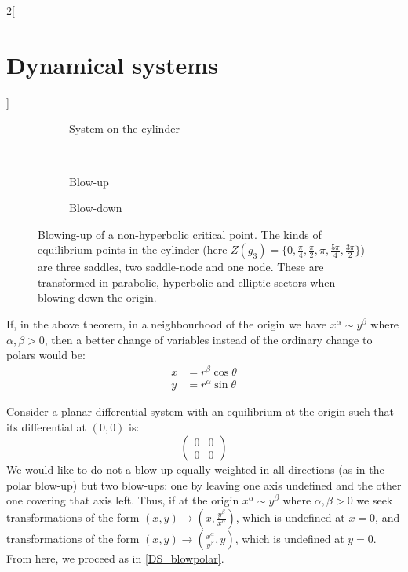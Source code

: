 \documentclass[../../../main_math.tex]{subfiles}
\begin{document}
\begin{multicols}{2}[\section{Dynamical systems}]
\begin{theorem}
  \end{theorem}
  \begin{figure}[H]
    \centering
    \begin{subfigure}[b]{\linewidth}
      \centering
      
      \caption{System on the cylinder}
    \end{subfigure}
    \\
    \begin{subfigure}[b]{0.48\linewidth}
      \centering
      
      \caption{Blow-up}
    \end{subfigure}
    \hfill
    \begin{subfigure}[b]{0.48\linewidth}
      \centering
      
      \caption{Blow-down}
    \end{subfigure}
    \caption{Blowing-up of a non-hyperbolic critical point. The kinds of equilibrium points in the cylinder (here $Z(g_3)=\{0,\frac{\pi}{4},\frac{\pi}{2}, \pi, \frac{5\pi}{4}, \frac{3\pi}{2}\}$) are three saddles, two saddle-node and one node. These are transformed in parabolic, hyperbolic and elliptic sectors when blowing-down the origin.}
    \label{DS_blowup}
  \end{figure}
  \begin{corollary}
    If, in the above theorem, in a neighbourhood of the origin we have $x^\alpha \sim y^\beta$ where $\alpha,\beta>0$, then a better change of variables instead of the ordinary change to polars would be:
    \begin{align*}
      x & =r^\beta\cos\theta  \\
      y & =r^\alpha\sin\theta
    \end{align*}
  \end{corollary}
  \begin{theorem}\label{DS_blowcarte}
    Consider a planar differential system with an equilibrium at the origin such that its differential at $(0,0)$ is:
    $$\begin{pmatrix}
        0 & 0 \\
        0 & 0
      \end{pmatrix}$$
    We would like to do not a blow-up equally-weighted in all directions (as in the polar blow-up) but two blow-ups: one by leaving one axis undefined and the other one covering that axis left. Thus, if at the origin $x^\alpha \sim y^\beta$ where $\alpha,\beta>0$ we seek transformations of the form $(x,y)\rightarrow\left(x,\frac{y^\beta}{x^\alpha}\right)$, which is undefined at $x=0$, and transformations of the form $(x,y)\rightarrow\left(\frac{x^\alpha}{y^\beta},y\right)$, which is undefined at $y=0$. From here, we proceed as in \cref{DS_blowpolar}.
  \end{theorem}

\end{multicols}
\end{document}
